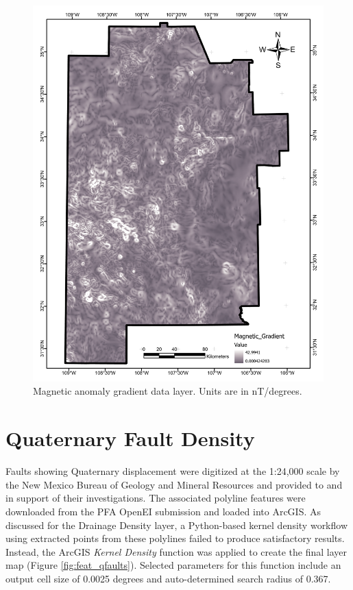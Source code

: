 \begin{figure}[H]
\centering
\includegraphics[width=0.75\linewidth]{templates/images/Figure-MagneticGradient.pdf}
\caption[Magnetic anomaly gradient data layer]{Magnetic anomaly gradient data layer. Units are in nT/degrees.}
\label{fig:feat_magnetic_gradient}
\end{figure}
\pagebreak

\section{Quaternary Fault Density}\label{app:dl_quat_fault_density}
Faults showing Quaternary displacement were digitized at the 1:24,000 scale by the New Mexico Bureau of Geology and Mineral Resources and provided to \citet{bielicki_hydrogeolgic_2015} and \citet{pepin_new_2019} in support of their investigations. The associated polyline features were downloaded from the PFA OpenEI submission \citep{kelley_geothermal_2015} and loaded into ArcGIS. As discussed for the Drainage Density layer, a Python-based kernel density workflow using extracted points from these polylines failed to produce satisfactory results. Instead, the ArcGIS \textit{Kernel Density} function was applied to create the final layer map (Figure \ref{fig:feat_qfaults}). Selected parameters for this function include an output cell size of 0.0025 degrees and auto-determined search radius of 0.367.
\vfill
\pagebreak


